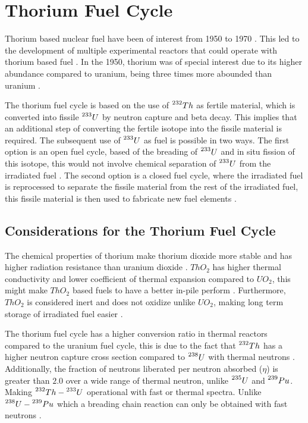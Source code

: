\chapter{Thorium Fuel Cycle}

Thorium based nuclear fuel have been of interest from 1950 to 1970 \cite{Th_cycle_viability}. This led to the development of multiple experimental reactors that could operate with thorium based fuel \cite{TMSR_book}. In the 1950, thorium was of special interest due to its higher abundance compared to uranium, being three times more abounded than uranium \cite{Th_cycle_viability,TMSR_book}.

The thorium fuel cycle is based on the use of \(\prescript{232}{}{Th}\) as fertile material, which is converted into fissile \(\prescript{233}{}{U}\) by neutron capture and beta decay. This implies that an additional step of converting the fertile isotope into the fissile material is required. The subsequent use of \(\prescript{233}{}{U}\) as fuel is possible in two ways. The first option is an open fuel cycle, based of the breading of \(\prescript{233}{}{U}\) and in situ fission of this isotope, this would not involve chemical separation of \(\prescript{233}{}{U}\) from the irradiated fuel \cite{IAEA_Th_Potential}. The second option is a closed fuel cycle, where the irradiated fuel is reprocessed to separate the fissile material from the rest of the irradiated fuel, this fissile material is then used to fabricate new fuel elements \cite{IAEA_Th_Potential}. 

\section{Considerations for the Thorium Fuel Cycle}

The chemical properties of thorium make thorium dioxide more stable and has higher radiation resistance than uranium dioxide \cite{IAEA_Th_Potential}. \(ThO_2\) has higher thermal conductivity and lower coefficient of thermal expansion compared to \(UO_2\), this might make \(ThO_2\) based fuels to have a better in-pile perform \cite{IAEA_Th_Potential}. Furthermore, \(ThO_2\) is considered inert and does not oxidize unlike \(UO_2\), making long term storage of irradiated fuel easier \cite{IAEA_Th_Potential}.

The thorium fuel cycle has a higher conversion ratio in thermal reactors compared to the uranium fuel cycle, this is due to the fact that \(\prescript{232}{}{Th}\) has a higher neutron capture cross section compared to \(\prescript{238}{}{U}\) with thermal neutrons \cite{IAEA_Th_Potential}. Additionally, the fraction of neutrons liberated per neutron absorbed (\(\eta\)) is greater than \(2.0\) over a wide range of thermal neutron, unlike \(\prescript{235}{}{U}\) and \(\prescript{239}{}{Pu}\). Making \(\prescript{232}{}{Th} - \prescript{233}{}{U}\) operational with fast or thermal spectra. Unlike \(\prescript{238}{}{U} - \prescript{239}{}{Pu}\) which a breading chain reaction can only be obtained with fast neutrons \cite{IAEA_Th_Potential}.

